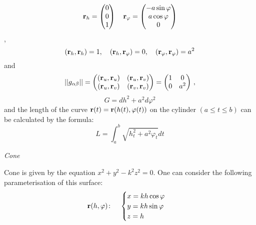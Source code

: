\documentclass[12pt]{article}
\theoremstyle{theorem}
\numberwithin{equation}{section}
\begin{document}
  \begin{equation}\label{cyl1}
  {\bf r}_h=\begin{pmatrix}
        0\\
        0\\
        1\\
   \end{pmatrix}
\quad
  {\bf r}_\varphi=\begin{pmatrix}
        -a\sin\varphi\\
        a\cos\varphi\\
          0\\
   \end{pmatrix}
 \end{equation},
            $$
     ({\bf r}_h,{\bf r}_h)=1,\quad
     ({\bf r}_h,{\bf r}_\varphi)=0,\quad
     ({\bf r}_\varphi,{\bf r}_\varphi)=a^2
            $$
and
\begin{equation*}\label{formula forfirstformcyl}
||g_{\alpha\beta}||=
   \begin{pmatrix}
   ({\bf r}_u,{\bf r}_u) & ({\bf r}_u,{\bf r}_v) \\
   ({\bf r}_u,{\bf r}_v) & ({\bf r}_v,{\bf r}_v) \\
   \end{pmatrix}=   \begin{pmatrix}
   1 & 0 \\
   0& a^2 \\
   \end{pmatrix}\,,
\end{equation*}
\begin{equation}\label{formula forfirstformcyl}
   G=dh^2+a^2d\varphi^2
\end{equation}
  and the length of the curve ${\bf r}(t)={\bf r} (h(t), \varphi(t))$ on the cylinder
    $(a\leq t\leq b)$
  can be calculated by the formula:
               \begin{equation}
             L=
             \int_a^b\sqrt{h_t^2+a^2\varphi_t}dt
               \end{equation}



\medskip

  \centerline {\it Cone}
 Cone is given by the equation $x^2+y^2-k^2z^2=0$.
One can consider the following
parameterisation
 of this surface:
\begin{equation}\label{surfacecone}
  {\bf r}(h,\varphi)\colon\quad
  \begin{cases}
  x=kh\cos\varphi\\
  y=kh\sin\varphi\\
  z=h\\
  \end{cases}
\end{equation}
\end{document}
